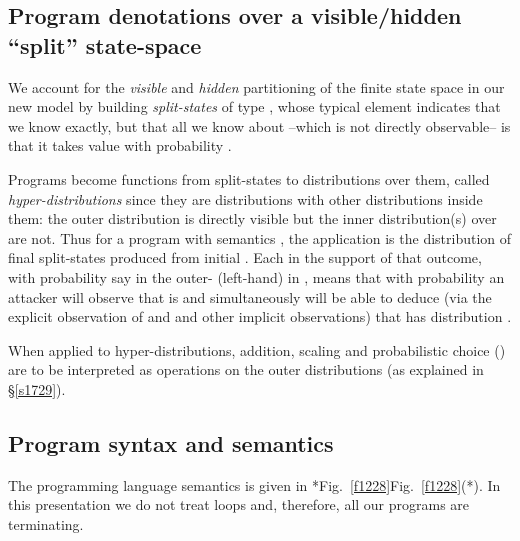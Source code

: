 \documentclass[runningheads]{llncs}
\newcommand\Sec[1] {Sec.~\ref{#1}}
\renewcommand\Sec[1] {\S\ref{#1}}
\newcommand\Fig[2][*] {{\def\z{#1}\if*\z Fig.~\ref{#2}\else Fig.~\ref{#2}(#1)\fi}}
\begin{document}
\subsection{Program denotations over a visible/hidden ``split'' state-space}
We account for the \emph{visible} and \emph{hidden} partitioning of the finite state space  in our new model by building \emph{split-states} of type , whose typical element  indicates that we know  exactly, but that all we know about  --which is not directly observable-- is that it takes value  with probability . 

Programs become functions  from split-states to distributions over them, called \emph{hyper-distributions} since they are distributions with other distributions inside them: the outer distribution is directly visible but the inner distribution(s) over  are not. Thus for a program  with semantics , the application  is the distribution of final split-states produced from initial . Each  in the support of that outcome, with probability  say in the outer- (left-hand)  in , means that with probability  an attacker will observe that  is  and simultaneously will be able to deduce (via the explicit observation of  and  and other implicit observations) that  has distribution .

When applied to hyper-distributions, addition, scaling and probabilistic choice () are to be interpreted as operations on the outer distributions (as explained in \Sec{s1729}).

\subsection{Program syntax and semantics}\label{s47563}

The programming language semantics is given in \Fig{f1228}. In this presentation we do not treat loops and, therefore, all our programs are terminating. 
\end{document}
